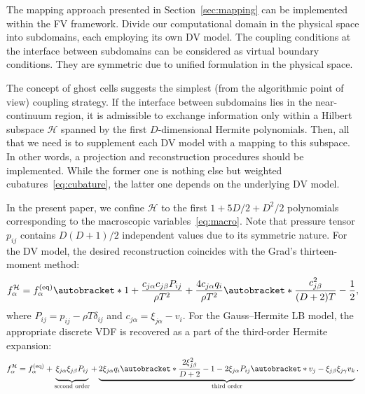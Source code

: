 \documentclass[]{elsarticle} %
\DeclarePairedDelimiter\autobracket()       %
\newcommand{\br}[1]{\autobracket*{#1}}
\newcommand{\xiai}{\xi_{j \alpha}}
\newcommand{\xiaj}{\xi_{j \beta}}
\newcommand{\xiak}{\xi_{j \gamma}}
\newcommand{\cai}{c_{j \alpha}}
\newcommand{\caj}{c_{j \beta}}
\newcommand{\equil}[1]{#1^\mathrm{(eq)}}
\begin{document}
{%

The mapping approach presented in Section~\ref{sec:mapping} can be implemented within the FV framework.
Divide our computational domain in the physical space into subdomains, each employing its own DV model.
The coupling conditions at the interface between subdomains can be considered as virtual boundary conditions.
They are symmetric due to unified formulation in the physical space.

The concept of ghost cells suggests the simplest (from the algorithmic point of view) coupling strategy.
If the interface between subdomains lies in the near-continuum region,
it is admissible to exchange information only within a Hilbert subspace \(\mathcal{H}\)
spanned by the first \(D\)-dimensional Hermite polynomials.
Then, all that we need is to supplement each DV model with a mapping to this subspace.
In other words, a projection and reconstruction procedures should be implemented.
While the former one is nothing else but weighted cubatures~\eqref{eq:cubature},
the latter one depends on the underlying DV model.

In the present paper, we confine \(\mathcal{H}\) to the first \(1+5D/2+D^2/2\) polynomials
corresponding to the macroscopic variables~\eqref{eq:macro}.
Note that pressure tensor \(p_{ij}\) contains \(D(D+1)/2\) independent values due to its symmetric nature.
For the DV model, the desired reconstruction coincides with the Grad's thirteen-moment method:
\begin{equation}\label{eq:interface_dvm}
    f^{\mathcal{H}}_\alpha = \equil{f}_\alpha\br{
        1 + \frac{\cai\caj P_{ij}}{\rho T^2} + \frac{4\cai q_i}{\rho T^2}\br{\frac{\caj^2}{(D+2)T} - \frac12} },
\end{equation}
where \(P_{ij} = p_{ij} - \rho T\delta_{ij}\) and \(\cai = \xiai - v_i\).
For the Gauss--Hermite LB model, the appropriate discrete VDF is recovered as a part of the third-order Hermite expansion:
\begin{equation}\label{eq:interface_lbm}
    f^{\mathcal{H}}_\alpha = \equil{f}_\alpha + \underbrace{ \vphantom{ \br{\frac{2\xiaj^2}{D+2}-1} }
        \xiai\xiaj P_{ij}
    }_\text{second order} + \underbrace{
        2\xiai q_i\br{\frac{2\xiaj^2}{D+2}-1} - 2\xiai P_{ij}\br{ v_j - \xiaj\xiak v_k }
    }_\text{third order}.
\end{equation}

}
\end{document}
